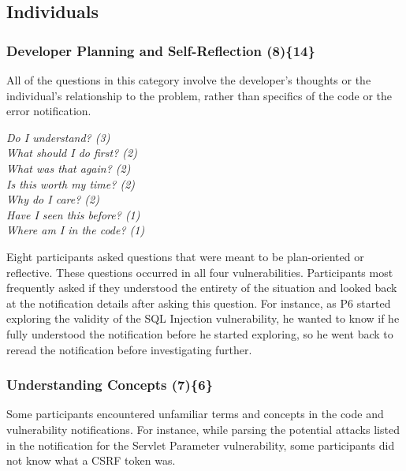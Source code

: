 \documentclass{acm_proc_article-sp}
\begin{document}
\subsection{Individuals}
\label{sec:results-i}



\subsubsection{\textbf{Developer Planning and Self-Reflection (8)\{14\}}} \label{dpr}
 
All of the questions in this category involve the developer's thoughts or the individual's relationship to the problem, rather than specifics of the code or the error notification.


\noindent\emph{Do I understand? (3)} \\
\emph{What should I do first? (2)} \\
\emph{What was that again? (2)} \\
\emph{Is this worth my time? (2)} \\
\emph{Why do I care? (2)} \\
\emph{Have I seen this before? (1)} \\
\emph{Where am I in the code? (1)} 


 
Eight participants asked questions that were meant to be plan-oriented or reflective.
These questions occurred in all four vulnerabilities.
Participants most frequently asked if they understood the entirety of the situation and looked back at the notification details after asking this question. 
For instance, as P6 started exploring the validity of the SQL Injection vulnerability, he wanted to know if he fully understood the notification before he started exploring, so he went back to reread the notification before investigating further.



\subsubsection{\textbf{Understanding Concepts (7)\{6\}}}\label{uc}

Some participants encountered unfamiliar terms and concepts in the code and vulnerability notifications.
For instance, while parsing the potential attacks listed in the notification for the Servlet Parameter vulnerability, some participants did not know what a CSRF token was.
\end{document}
